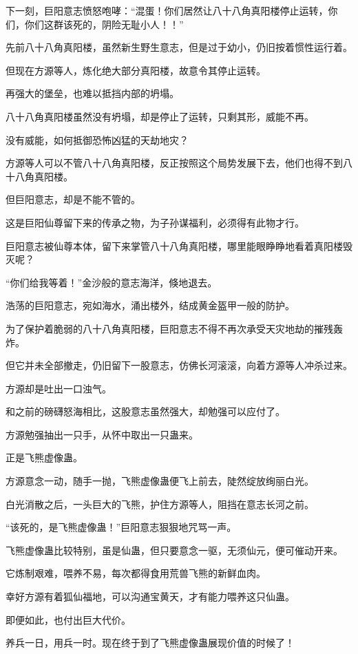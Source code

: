 \begin{this_body}
下一刻，巨阳意志愤怒咆哮：“混蛋！你们居然让八十八角真阳楼停止运转，你们，你们这群该死的，阴险无耻小人！！”

先前八十八角真阳楼，虽然新生野生意志，但是过于幼小，仍旧按着惯性运行着。

但现在方源等人，炼化绝大部分真阳楼，故意令其停止运转。

再强大的堡垒，也难以抵挡内部的坍塌。

八十八角真阳楼虽然没有坍塌，却是停止了运转，只剩其形，威能不再。

没有威能，如何抵御恐怖凶猛的天劫地灾？

方源等人可以不管八十八角真阳楼，反正按照这个局势发展下去，他们也得不到八十八角真阳楼。

但巨阳意志，却是不能不管的。

这是巨阳仙尊留下来的传承之物，为子孙谋福利，必须得有此物才行。

巨阳意志被仙尊本体，留下来掌管八十八角真阳楼，哪里能眼睁睁地看着真阳楼毁灭呢？

“你们给我等着！”金沙般的意志海洋，倏地退去。

浩荡的巨阳意志，宛如海水，涌出楼外，结成黄金盔甲一般的防护。

为了保护着脆弱的八十八角真阳楼，巨阳意志不得不再次承受天灾地劫的摧残轰炸。

但它并未全部撤走，仍旧留下一股意志，仿佛长河滚滚，向着方源等人冲杀过来。

方源却是吐出一口浊气。

和之前的磅礴怒海相比，这股意志虽然强大，却勉强可以应付了。

方源勉强抽出一只手，从怀中取出一只蛊来。

正是飞熊虚像蛊。

方源意念一动，随手一抛，飞熊虚像蛊便飞上前去，陡然绽放绚丽白光。

白光消散之后，一头巨大的飞熊，护住方源等人，阻挡在意志长河之前。

“该死的，是飞熊虚像蛊！”巨阳意志狠狠地咒骂一声。

飞熊虚像蛊比较特别，虽是仙蛊，但只要意念一驱，无须仙元，便可催动开来。

它炼制艰难，喂养不易，每次都得食用荒兽飞熊的新鲜血肉。

幸好方源有着狐仙福地，可以沟通宝黄天，才有能力喂养这只仙蛊。

即便如此，也付出巨大代价。

养兵一日，用兵一时。现在终于到了飞熊虚像蛊展现价值的时候了！

\end{this_body}

